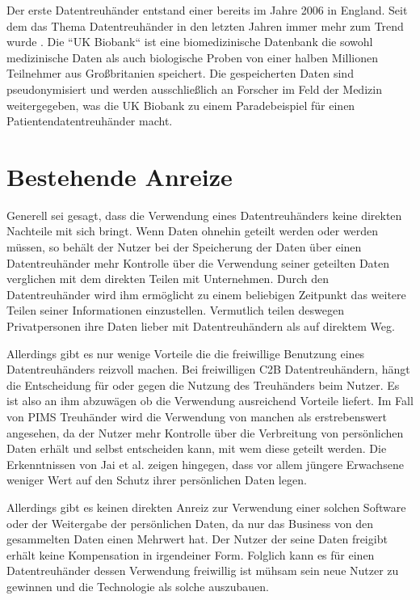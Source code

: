 \documentclass[11pt,a4paper]{scrreprt}
\begin{document}
\cite{dt-blankertz2021regulierung}\cite{dt-blankertz2021neue}\cite{dt-bundesdruckereiDatentreuhänder}

Der erste Datentreuhänder entstand einer bereits im Jahre 2006 in England. Seit dem das Thema Datentreuhänder in den letzten Jahren immer mehr zum Trend wurde \cite{dt-richter2020ddvtalk}. Die ``UK Biobank`` ist eine biomedizinische Datenbank die sowohl medizinische Daten als auch biologische Proben von einer halben Millionen Teilnehmer aus Großbritanien speichert\cite{dt-hardinges2018data}. Die gespeicherten Daten sind pseudonymisiert und werden ausschließlich an Forscher im Feld der Medizin weitergegeben, was die UK Biobank zu einem Paradebeispiel für einen Patientendatentreuhänder macht.



\section{Bestehende Anreize}
Generell sei gesagt, dass die Verwendung eines Datentreuhänders keine direkten Nachteile mit sich bringt. Wenn Daten ohnehin geteilt werden oder werden müssen, so behält der Nutzer bei der Speicherung der Daten über einen Datentreuhänder mehr Kontrolle über die Verwendung seiner geteilten Daten verglichen mit dem direkten Teilen mit Unternehmen. Durch den Datentreuhänder wird ihm ermöglicht zu einem beliebigen Zeitpunkt das weitere Teilen seiner Informationen einzustellen. Vermutlich teilen deswegen Privatpersonen ihre Daten lieber mit Datentreuhändern als auf direktem Weg. \cite{dt-tresor24study}

Allerdings gibt es nur wenige Vorteile die die freiwillige Benutzung eines Datentreuhänders reizvoll machen. Bei freiwilligen C2B Datentreuhändern, hängt die Entscheidung für oder gegen die Nutzung des Treuhänders beim Nutzer. Es ist also an ihm abzuwägen ob die Verwendung ausreichend Vorteile liefert. Im Fall von PIMS Treuhänder wird die Verwendung von manchen als erstrebenswert angesehen, da der Nutzer mehr Kontrolle über die Verbreitung von persönlichen Daten erhält und selbst entscheiden kann, mit wem diese geteilt werden. Die Erkenntnissen von Jai et al. \cite{dt-jai2016privacy} zeigen hingegen, dass vor allem jüngere Erwachsene weniger Wert auf den Schutz ihrer persönlichen Daten legen.

Allerdings gibt es keinen direkten Anreiz zur Verwendung einer solchen Software oder der Weitergabe der persönlichen Daten, da nur das Business von den gesammelten Daten einen Mehrwert hat. Der Nutzer der seine Daten freigibt erhält keine Kompensation in irgendeiner Form. Folglich kann es für einen Datentreuhänder dessen Verwendung freiwillig ist mühsam sein neue Nutzer zu gewinnen und die Technologie als solche auszubauen.
\end{document}
